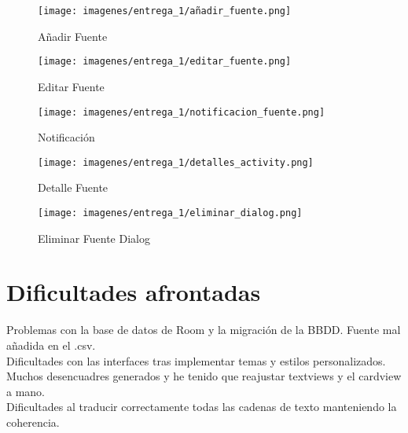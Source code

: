 \documentclass[11pt,a4paper]{article}
\begin{document}
\begin{figure}[H]
    \centering
    \texttt{[image: imagenes/entrega\_1/añadir\_fuente.png]}
    \caption{Añadir Fuente}
    \label{añadir}
\end{figure}
\begin{figure}[H]
    \centering
    \texttt{[image: imagenes/entrega\_1/editar\_fuente.png]}
    \caption{Editar Fuente}
    \label{editar}
\end{figure}
\begin{figure}[H]
    \centering
    \texttt{[image: imagenes/entrega\_1/notificacion\_fuente.png]}
    \caption{Notificación}
    \label{noti}
\end{figure}
\begin{figure}[H]
    \centering
    \texttt{[image: imagenes/entrega\_1/detalles\_activity.png]}
    \caption{Detalle Fuente}
    \label{detalle}
\end{figure}
\begin{figure}[H]
    \centering
    \texttt{[image: imagenes/entrega\_1/eliminar\_dialog.png]}
    \caption{Eliminar Fuente Dialog}
    \label{delete}
\end{figure}

\newpage

\section{Dificultades afrontadas}

    Problemas con la base de datos de Room y la migración de la BBDD. Fuente mal añadida en el .csv.\\
    Dificultades con las interfaces tras implementar temas y estilos personalizados. Muchos desencuadres generados y he tenido que reajustar textviews y el cardview a mano.\\
    Dificultades al traducir correctamente todas las cadenas de texto manteniendo la coherencia.\\
\end{document}

